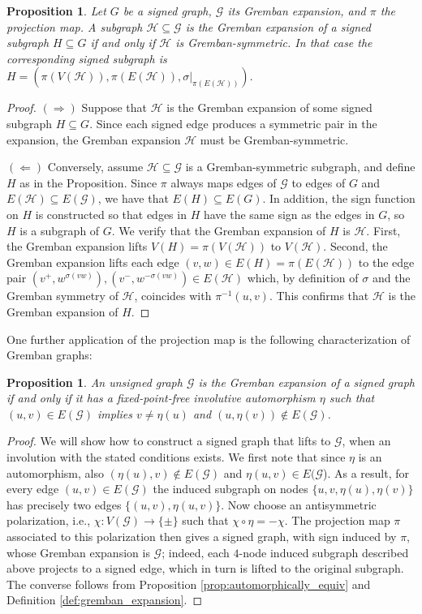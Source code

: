 \documentclass[reprint,onecolumn]{article}
\newtheorem{proposition}[theorem]{Proposition}
\newcommand{\mc}[1]{\mathcal{#1}}
\newcommand{\1}{\mathbb{1}}
\newcommand{\0}{\mathbf{0}}
\begin{document}
\begin{proposition}\label{prop:projection_subgraph}
Let $G$ be a signed graph, $\mc G$ its Gremban expansion, and $\pi$ the projection map. A subgraph $\mathcal{H}\subseteq \mathcal{G}$ is the Gremban expansion of a signed subgraph $H\subseteq G$ if and only if $\mathcal{H}$ is Gremban-symmetric.  In that case the corresponding signed subgraph is $H = (\pi(V(\mathcal{H})), \pi(E(\mathcal{H})), \sigma|_{\pi(E(\mathcal{H}))}).$
\end{proposition}
\begin{proof}
$(\!\Rightarrow\!)$  Suppose that $\mathcal{H}$ is the Gremban expansion of some signed subgraph $H\subseteq G$. 
Since each signed edge produces a symmetric pair in the expansion, the Gremban expansion $\mathcal{H}$ must be Gremban-symmetric.

$(\!\Leftarrow\!)$ Conversely, assume $\mathcal{H}\subseteq\mathcal{G}$ is a Gremban-symmetric subgraph, and define $H$ as in the Proposition. Since $\pi$ always maps edges of $\mathcal{G}$ to edges of $G$ and $E(\mathcal{H})\subseteq E(\mathcal{G})$, we have that $E(H)\subseteq E(G)$. In addition, the sign function on $H$ is constructed so that edges in $H$ have the same sign as the edges in $G$, so $H$ is a subgraph of $G$. We verify that the Gremban expansion of $H$ is $\mathcal{H}$. First, the Gremban expansion lifts $V(H)=\pi(V(\mathcal{H}))$ to $V(\mathcal{H})$. Second, the Gremban expansion lifts each edge $(v,w)\in E(H)=\pi(E(\mathcal{H}))$ to the edge pair $(v^+,w^{\sigma(vw)}),(v^-,w^{-\sigma(vw)})\in E(\mathcal{H})$ which, by definition of $\sigma$ and the Gremban symmetry of $\mathcal{H}$, coincides with $\pi^{-1}(u,v)$. This confirms that $\mathcal{H}$ is the Gremban expansion of $H$. 
\end{proof}
One further application of the projection map is the following characterization of Gremban graphs:
\begin{proposition}\label{prop:characterization of Gremban graphs}
An unsigned graph $\mathcal{G}$ is the Gremban expansion of a signed graph if and only if it has a fixed-point-free involutive automorphism $\eta$ such that $(u,v)\in E(\mc G)$ implies $v\neq \eta(u)$ and $(u,\eta(v))\not\in E(\mc G)$.
\end{proposition}
\begin{proof}
We will show how to construct a signed graph that lifts to $\mathcal{G}$, when an involution with the stated conditions exists. We first note that since $\eta$ is an automorphism, also $(\eta(u),v)\not\in E(\mathcal{G})$ and $\eta(u,v)\in E(\mathcal{G}$). As a result, for every edge $(u,v)\in E(\mc G)$ the induced subgraph on nodes $\{u,v,\eta(u),\eta(v)\}$ has precisely two edges $\{(u,v),\eta(u,v)\}$.
Now choose an antisymmetric polarization, i.e.,  $\chi:V(\mathcal{G})\rightarrow\{\pm\}$ such that $\chi\circ\eta=-\chi$. The projection map $\pi$ associated to this polarization then gives a signed graph, with sign induced by $\pi$, whose Gremban expansion is $\mathcal{G}$; indeed, each $4$-node induced subgraph described above projects to a signed edge, which in turn is lifted to the original subgraph. The converse follows from Proposition \ref{prop:automorphically_equiv} and Definition \ref{def:gremban_expansion}. 
\end{proof}
\end{document}
